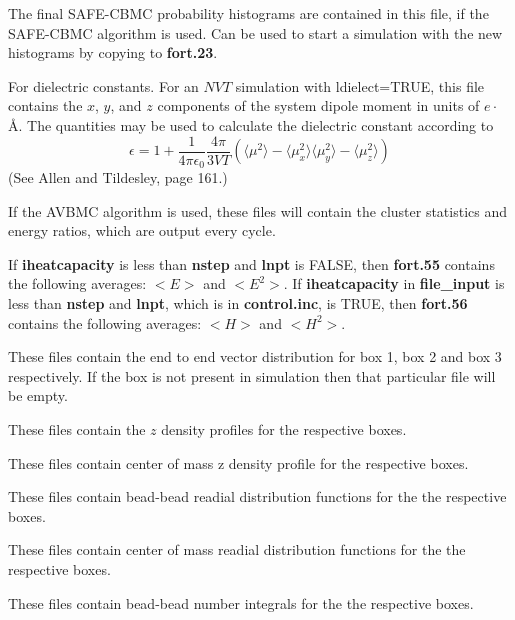 \documentclass[12pt,letterpaper]{article}
\begin{document}
 The final SAFE-CBMC probability
histograms are contained in this file, if the SAFE-CBMC
algorithm is used. Can be used to start a simulation with
the new histograms by copying to {\bf fort.23}.

 For dielectric constants. For an
$NVT$ simulation with ldielect=TRUE, this file contains
the $x$, $y$, and $z$ components of the system dipole moment
in units of $e\cdot$\AA. The quantities may be used to
calculate the dielectric constant according to
\begin{equation}
\epsilon = 1 + \frac{1}{4\pi\epsilon_0} \frac{4 \pi}{3VT} \left ( \langle \mu^2 \rangle - \langle \mu_x^2 \rangle
 \langle \mu_y^2 \rangle - \langle \mu_z^2 \rangle \right )
\end{equation}
(See Allen and Tildesley, page 161.)

 If the AVBMC
algorithm is used, these files will contain the cluster
statistics and energy ratios, which are output every cycle.

 If {\bf iheatcapacity} is
less than {\bf nstep} and {\bf lnpt} is FALSE, then {\bf
  fort.55} contains the following averages: $<E>$ and
$<E^2>$. If {\bf iheatcapacity} in {\bf file\_input} is less
than {\bf nstep} and {\bf lnpt}, which is in {\bf
  control.inc}, is TRUE, then {\bf fort.56} contains the
following averages: $<H>$ and $<H^2>$.

These files contain the end to end vector distribution for
box 1, box 2 and box 3 respectively. If the box is not
present in simulation then that particular file will be
empty.

 These
files contain the $z$ density profiles for the respective
boxes.

These files contain center of mass z density profile for the
respective boxes.

These files contain bead-bead readial distribution functions
for the the respective boxes.

These files contain center of mass readial distribution
functions for the the respective boxes.

These files contain bead-bead number integrals for the the
respective boxes.
\end{document}
